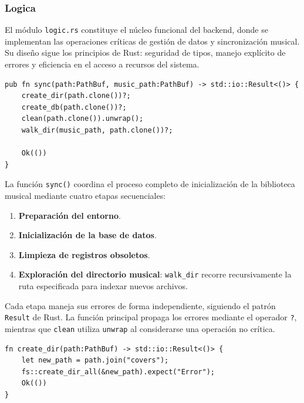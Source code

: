 \documentclass[11pt, a4paper]{article}
\begin{document}
            \subsubsection{Logica}

            El módulo \texttt{logic.rs} constituye el núcleo funcional del backend, donde se implementan las operaciones críticas de gestión de datos y sincronización musical. Su diseño sigue los principios de Rust: seguridad de tipos, manejo explícito de errores y eficiencia en el acceso a recursos del sistema.

            \begin{lstlisting}[caption={fn sync()}]
pub fn sync(path:PathBuf, music_path:PathBuf) -> std::io::Result<()> {
    create_dir(path.clone())?;
    create_db(path.clone())?;
    clean(path.clone()).unwrap();
    walk_dir(music_path, path.clone())?;

    Ok(())
}
            \end{lstlisting}

            La función \texttt{sync()} coordina el proceso completo de inicialización de la biblioteca musical mediante cuatro etapas secuenciales:

            \begin{enumerate}
                \item \textbf{Preparación del entorno}.
                \item \textbf{Inicialización de la base de datos}.
                \item \textbf{Limpieza de registros obsoletos}.
                \item \textbf{Exploración del directorio musical}: \texttt{walk\_dir} recorre recursivamente la ruta especificada para indexar nuevos archivos.
            \end{enumerate}

            Cada etapa maneja sus errores de forma independiente, siguiendo el patrón \texttt{Result} de Rust. La función principal propaga los errores mediante el operador \texttt{?}, mientras que \texttt{clean} utiliza \texttt{unwrap} al considerarse una operación no crítica.

            \begin{lstlisting}[caption={fn create\_dir()}]
fn create_dir(path:PathBuf) -> std::io::Result<()> {
    let new_path = path.join("covers");
    fs::create_dir_all(&new_path).expect("Error");
    Ok(())
}
            \end{lstlisting}
\end{document}

